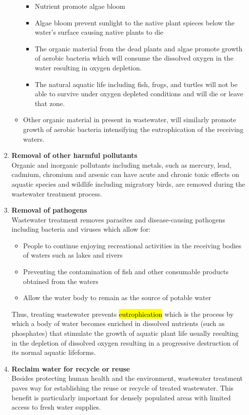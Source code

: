 \begin{enumerate}
\begin{itemize}
\begin{itemize}
\item Nutrient promote algae bloom
\item Algae bloom prevent sunlight to the native plant spieces below the water's surface causing native plants to die
\item The organic material from the dead plants and algae promote growth of aerobic bacteria which will consume the dissolved oxygen in the water resulting in oxygen depletion.
\item The natural aquatic life including fish, frogs, and turtles will not be able to survive under oxygen depleted conditions and will die or leave that zone.
\end{itemize}
\item Other organic material in present in wastewater, will similarly promote growth of aerobic bacteria intensifying the eutrophication of the receiving waters.
\end{itemize}
\item \textbf{Removal of other harmful pollutants}\\
Organic and inorganic pollutants including metals, such as mercury, lead, cadmium, chromium and arsenic can have acute and chronic toxic effects on aquatic species and wildlife including migratory birds, are removed during the wastewater treatment process.
\item \textbf{Removal of pathogens}\\
Wastewater treatment removes parasites and disease-causing pathogens including bacteria and viruses which allow for:
\begin{itemize}
\item People to continue enjoying recreational activities in the receiving bodies of waters such as lakes and rivers
\item Preventing the contamination of fish and other consumable products obtained from the waters
\item Allow the water body to remain as the source of potable water
\end{itemize}
Thus, treating wastewater prevents \hl{eutrophication} which is the process by which a body of water becomes enriched in dissolved nutrients (such as phosphates) that stimulate the growth of aquatic plant life usually resulting in the depletion of dissolved oxygen resulting in a progressive destruction of its normal aquatic lifeforms.
\item \textbf{Reclaim water for recycle or reuse}\\
Besides protecting human health and the environment, wastewater treatment paves way for establishing the reuse or recycle of treated wastewater.  This benefit is particularly important for densely populated areas with limited access to fresh water supplies.  
\end{enumerate}

